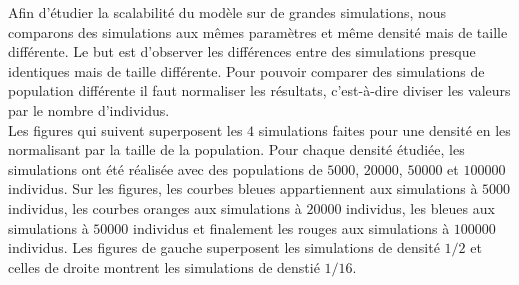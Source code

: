 Afin d'étudier la scalabilité du modèle sur de grandes simulations, nous comparons des simulations aux mêmes paramètres et même densité mais de taille différente. Le but est d'observer les différences entre des simulations presque identiques mais de taille différente. Pour pouvoir comparer des simulations de population différente il faut normaliser les résultats, c'est-à-dire diviser les valeurs par le nombre d'individus.\\

Les figures qui suivent superposent les $4$ simulations faites pour une densité en les normalisant par la taille de la population. Pour chaque densité étudiée, les simulations ont été réalisée avec des populations de $5000$, $20000$, $50000$ et $100000$ individus. Sur les figures, les courbes bleues appartiennent aux simulations à $5000$ individus, les courbes oranges aux simulations à $20000$ individus, les bleues aux simulations à $50000$ individus et finalement les rouges aux simulations à $100000$ individus. Les figures de gauche superposent les simulations de densité $1/2$ et celles de droite montrent les simulations de denstié $1/16$.

